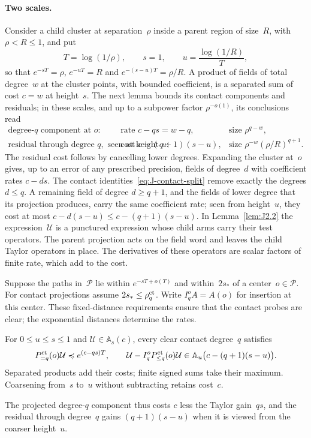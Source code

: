 \paragraph{Two scales.} Consider a child cluster at separation~$\rho$ inside a parent region of size~$R$, with $\rho<R\le1$, and put
\begin{equation*}
T=\log(1/\rho),\qquad s=1,\qquad u=\frac{\log(1/R)}{T},
\end{equation*}
so that $e^{-sT}=\rho$, $e^{-uT}=R$ and $e^{-(s-u)T}=\rho/R$.
A product of fields of total degree~$w$ at the cluster points, with bounded coefficient, is a separated sum of cost $c=w$ at height~$s$. The next lemma bounds its contact components and residuals; in these scales, and up to a subpower factor $\rho^{-o(1)}$, its conclusions read
\begin{equation*}
\begin{array}{lll}
\text{degree-$q$ component at }o: & \text{rate } c-qs=w-q, & \text{size } \rho^{q-w},\\[2pt]
\text{residual through degree }q,\text{ seen at height }u: & \text{cost } c-(q+1)(s-u), & \text{size } \rho^{-w}(\rho/R)^{q+1}.
\end{array}
\end{equation*}
The residual cost follows by cancelling lower degrees. Expanding the cluster at~$o$ gives, up to an error of any prescribed precision, fields of degree~$d$ with coefficient rates $c-ds$. The contact identities~\eqref{eq:J-contact-split} remove exactly the degrees $d\le q$. A remaining field of degree $d\ge q+1$, and the fields of lower degree that its projection produces, carry the same coefficient rate; seen from height~$u$, they cost at most $c-d(s-u)\le c-(q+1)(s-u)$. In Lemma~\ref{lem:J2.2} the expression~$\mathcal U$ is a punctured expression whose child arms carry their test operators. The parent projection acts on the field word and leaves the child Taylor operators in place. The derivatives of these operators are scalar factors of finite rate, which add to the cost.

Suppose the paths in~$\mathcal P$ lie within $e^{-sT+o(T)}$ and within~$2s_*$ of a center~$o\in\mathcal P$. For contact projections assume $2s_*\le \rho_q^{\rm ct}$. Write $I_q^oA=A(o)$ for insertion at this center. These fixed-distance requirements ensure that the contact probes are clear; the exponential distances determine the rates.

\begin{lemma}\label{lem:J-signed-layer}
For $0\le u\le s\le1$ and $\mathcal U\in\mathbb A_s(c)$, every clear contact degree~$q$ satisfies
\begin{equation*}
P_{=q}^{\rm ct}(o)\mathcal U\preccurlyeq e^{(c-qs)T},\qquad
 \mathcal U-I_q^oP_{\le q}^{\rm ct}(o)\mathcal U\in
 \mathbb A_u\bigl(c-(q+1)(s-u)\bigr).
\end{equation*}
Separated products add their costs; finite signed sums take their maximum. Coarsening from~$s$ to~$u$ without subtracting retains cost~$c$.
\end{lemma}
The projected degree-$q$ component thus costs $c$ less the Taylor gain~$qs$, and the residual through degree~$q$ gains $(q+1)(s-u)$ when it is viewed from the coarser height~$u$.

